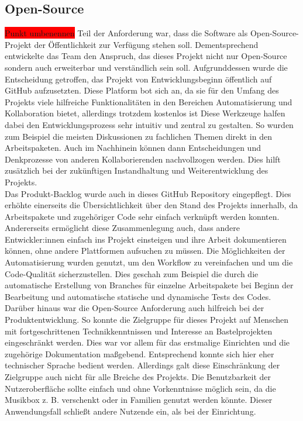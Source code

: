 \documentclass[10pt, a4paper]{article}
\begin{document}
\begin{onehalfspace}
  \subsection{Open-Source}
  \colorbox{red}{Punkt umbenennen}
  Teil der Anforderung war, dass die Software als Open-Source-Projekt der Öffentlichkeit zur Verfügung stehen soll.
  Dementsprechend entwickelte das Team den Anspruch, das dieses Projekt nicht nur Open-Source sondern auch erweiterbar und verständlich sein soll.
  Aufgrunddessen wurde die Entscheidung getroffen, das Projekt von Entwicklungsbeginn öffentlich auf GitHub aufzusetzten.
  Diese Platform bot sich an, da sie für den Umfang des Projekts viele hilfreiche Funktionalitäten in den Bereichen Automatisierung und Kollaboration bietet, allerdings trotzdem kostenlos ist
  Diese Werkzeuge halfen dabei den Entwicklungsprozess sehr intuitiv und zentral zu gestalten.
  So wurden zum Beispiel die meisten Diskussionen zu fachlichen Themen direkt in den Arbeitspaketen.
  Auch im Nachhinein können dann Entscheidungen und Denkprozesse von anderen Kollaborierenden nachvollzogen werden.
  Dies hilft zusätzlich bei der zukünftigen Instandhaltung und Weiterentwicklung des Projekts.
  \\
  Das Produkt-Backlog wurde auch in dieses GitHub Repository eingepflegt.
  Dies erhöhte einerseits die Übersichtlichkeit über den Stand des Projekts innerhalb, da Arbeitspakete und zugehöriger Code sehr einfach verknüpft werden konnten.
  Andererseits ermöglicht diese Zusammenlegung auch, dass andere Entwickler:innen einfach ins Projekt einsteigen und ihre Arbeit dokumentieren können, ohne andere Plattformen aufsuchen zu müssen.
  Die Möglichkeiten der Automatisierung wurden genutzt, um den Workflow zu vereinfachen und um die Code-Qualität sicherzustellen.
  Dies geschah zum Beispiel die durch die automatische Erstellung von Branches für einzelne Arbeitspakete bei Beginn der Bearbeitung und automatische statische und dynamische Tests des Codes.
  \\
  Darüber hinaus war die Open-Source Anforderung auch hilfreich bei der Produktentwicklung.
  So konnte die Zielgruppe für dieses Projekt auf Menschen mit fortgeschrittenen Technikkenntnissen und Interesse an Bastelprojekten eingeschränkt werden.
  Dies war vor allem für das erstmalige Einrichten und die zugehörige Dokumentation maßgebend.
  Entsprechend konnte sich hier eher technischer Sprache bedient werden.
  Allerdings galt diese Einschränkung der Zielgruppe auch nicht für alle Breiche des Projekts.
  Die Benutzbarkeit der Nutzeroberfläche sollte einfach und ohne Vorkenntnisse möglich sein, da die Musikbox z. B. verschenkt oder in Familien genutzt werden könnte.
  Dieser Anwendungsfall schließt andere Nutzende ein, als bei der Einrichtung.



\end{onehalfspace}
\end{document}
